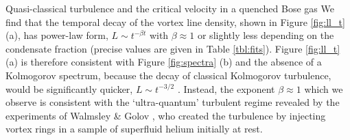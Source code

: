 \begin{chapter}{\label{cha:nonequib}Quasi-classical turbulence and the critical velocity in a quenched Bose gas}
We find that the temporal decay of the vortex line density, 
shown in Figure \ref{fig:ll_t} (a),
has power-law form, $L \sim t^{-\beta t}$ with $\beta \approx 1$ or slightly
less depending on the condensate fraction (precise values are given in Table \ref{tbl:fits}).
Figure \ref{fig:ll_t} (a) is therefore consistent with  Figure \ref{fig:spectra} (b)
and the absence of a Kolmogorov spectrum, 
because the decay of classical Kolmogorov turbulence, 
would be significantly quicker, $L \sim t^{-3/2}$ \cite{PhysRevLett.71.2583,PhysRevLett.82.4831}.
Instead, the exponent $\beta \approx 1$ which we observe is consistent with the 
`ultra-quantum' turbulent regime revealed by the experiments of
Walmsley \& Golov \cite{WalmsleyGolov2008}, who created the turbulence by
injecting vortex rings in a sample of superfluid helium initially at rest.


\end{chapter}
